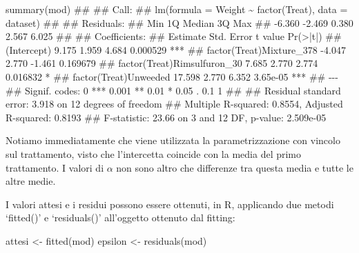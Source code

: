 \documentclass[a4paper,12pt,oneside]{book}
\newenvironment{Shaded}{\begin{snugshade}}{\end{snugshade}}
\newcommand{\DocumentationTok}[1]{#1}
\newcommand{\OtherTok}[1]{#1}
\newcommand{\FunctionTok}[1]{#1}
\newcommand{\NormalTok}[1]{#1}
\begin{document}
\begin{Shaded}
\begin{Highlighting}[]
\FunctionTok{summary}\NormalTok{(mod)}
\DocumentationTok{\#\# }
\DocumentationTok{\#\# Call:}
\DocumentationTok{\#\# lm(formula = Weight \textasciitilde{} factor(Treat), data = dataset)}
\DocumentationTok{\#\# }
\DocumentationTok{\#\# Residuals:}
\DocumentationTok{\#\#    Min     1Q Median     3Q    Max }
\DocumentationTok{\#\# {-}6.360 {-}2.469  0.380  2.567  6.025 }
\DocumentationTok{\#\# }
\DocumentationTok{\#\# Coefficients:}
\DocumentationTok{\#\#                             Estimate Std. Error t value Pr(\textgreater{}|t|)    }
\DocumentationTok{\#\# (Intercept)                    9.175      1.959   4.684 0.000529 ***}
\DocumentationTok{\#\# factor(Treat)Mixture\_378      {-}4.047      2.770  {-}1.461 0.169679    }
\DocumentationTok{\#\# factor(Treat)Rimsulfuron\_30    7.685      2.770   2.774 0.016832 *  }
\DocumentationTok{\#\# factor(Treat)Unweeded         17.598      2.770   6.352 3.65e{-}05 ***}
\DocumentationTok{\#\# {-}{-}{-}}
\DocumentationTok{\#\# Signif. codes:  0 \textquotesingle{}***\textquotesingle{} 0.001 \textquotesingle{}**\textquotesingle{} 0.01 \textquotesingle{}*\textquotesingle{} 0.05 \textquotesingle{}.\textquotesingle{} 0.1 \textquotesingle{} \textquotesingle{} 1}
\DocumentationTok{\#\# }
\DocumentationTok{\#\# Residual standard error: 3.918 on 12 degrees of freedom}
\DocumentationTok{\#\# Multiple R{-}squared:  0.8554, Adjusted R{-}squared:  0.8193 }
\DocumentationTok{\#\# F{-}statistic: 23.66 on 3 and 12 DF,  p{-}value: 2.509e{-}05}
\end{Highlighting}
\end{Shaded}

\normalsize

Notiamo immediatamente che viene utilizzata la parametrizzazione con vincolo sul trattamento, visto che l'intercetta coincide con la media del primo trattamento. I valori di \(\alpha\) non sono altro che differenze tra questa media e tutte le altre medie.

I valori attesi e i residui possono essere ottenuti, in R, applicando due metodi `fitted()' e `residuals()' all'oggetto ottenuto dal fitting:

\begin{Shaded}
\begin{Highlighting}[]
\NormalTok{attesi }\OtherTok{\textless{}{-}} \FunctionTok{fitted}\NormalTok{(mod)}
\NormalTok{epsilon }\OtherTok{\textless{}{-}} \FunctionTok{residuals}\NormalTok{(mod)}
\end{Highlighting}
\end{Shaded}
\end{document}
